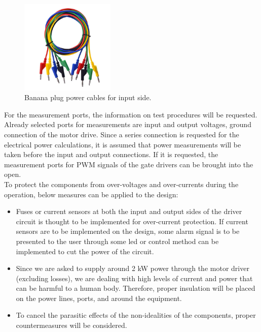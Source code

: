 \begin{figure}
    \centering
    \includegraphics[width=0.4\textwidth]{Figures/banana plugs.jpg}
    \caption{Banana plug power cables for input side.}
    \label{fig:banana}
\end{figure}

For the measurement ports, the information on test procedures will be requested. Already selected ports for measurements are input and output voltages, ground connection of the motor drive. Since a series connection is requested for the electrical power calculations, it is assumed that power measurements will be taken before the input and output connections. If it is requested, the measurement ports for PWM signals of the gate drivers can be brought into the open. \\

To protect the components from over-voltages and over-currents during the operation, below measures can be applied to the design:

\begin{itemize}
    \item Fuses or current sensors at both the input and output sides of the driver circuit is thought to be implemented for over-current protection. If current sensors are to be implemented on the design, some alarm signal is to be presented to the user through some led or control method can be implemented to cut the power of the circuit.
    \item Since we are asked to supply around 2 kW power through the motor driver (excluding losses), we are dealing with high levels of current and power that can be harmful to a human body. Therefore, proper insulation will be placed on the power lines, ports, and around the equipment.
    \item To cancel the parasitic effects of the non-idealities of the components, proper countermeasures will be considered.
\end{itemize}